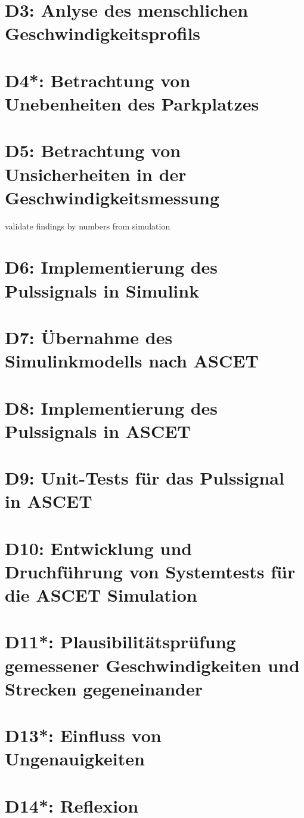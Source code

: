 \chapter{D3: Anlyse des menschlichen Geschwindigkeitsprofils}\label{cha:D3}

\chapter{D4*: Betrachtung von Unebenheiten des Parkplatzes}\label{cha:D4}

\chapter{D5: Betrachtung von Unsicherheiten in der Geschwindigkeitsmessung}\label{cha:D5}
validate findings by numbers from simulation

\chapter{D6: Implementierung des Pulssignals in Simulink}\label{cha:D6}

\chapter{D7: Übernahme des Simulinkmodells nach ASCET}\label{cha:D7}

\chapter{D8: Implementierung des Pulssignals in ASCET}\label{cha:D8}

\chapter{D9: Unit-Tests für das Pulssignal in ASCET}\label{cha:D9}

\chapter{D10: Entwicklung und Druchführung von Systemtests für die ASCET Simulation}\label{cha:D10}

\chapter{D11*: Plausibilitätsprüfung gemessener Geschwindigkeiten und  Strecken gegeneinander}\label{cha:D11}

\chapter{D13*: Einfluss von Ungenauigkeiten}\label{cha:D13}

\chapter{D14*: Reflexion}\label{cha:D14}